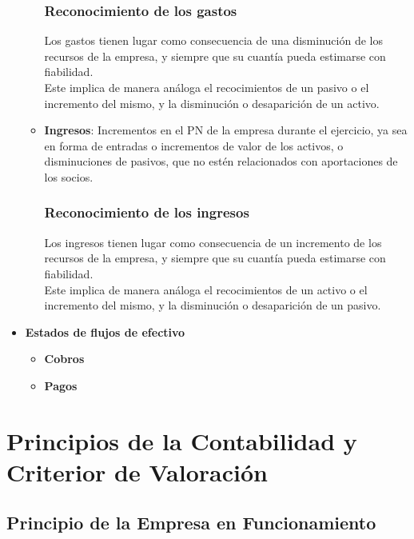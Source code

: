 \documentclass[a4paper,12pt]{article}
\begin{document}
\begin{itemize}
\begin{itemize}
        \subsubsection*{Reconocimiento de los gastos}

        Los gastos tienen lugar como consecuencia de una disminución de los recursos de la empresa, y siempre que su cuantía pueda estimarse con fiabilidad.\\
        Este implica de manera análoga el recocimientos de un pasivo o el incremento del mismo, y la disminución o desaparición de un activo.

        \item \textbf{Ingresos}: Incrementos en el PN de la empresa durante el ejercicio, ya sea en forma de entradas o incrementos de valor de los activos, o disminuciones de pasivos, que no estén relacionados con aportaciones de los socios.
        
        \subsubsection*{Reconocimiento de los ingresos}

        Los ingresos tienen lugar como consecuencia de un incremento de los recursos de la empresa, y siempre que su cuantía pueda estimarse con fiabilidad.\\
        Este implica de manera análoga el recocimientos de un activo o el incremento del mismo, y la disminución o desaparición de un pasivo.

    \end{itemize}
    \item \textbf{Estados de flujos de efectivo}
    \begin{itemize}
        \item \textbf{Cobros}
        \item \textbf{Pagos}
    \end{itemize}
\end{itemize}


\section{Principios de la Contabilidad y Criterior de Valoración}

\subsection{Principio de la Empresa en Funcionamiento}
\end{document}
